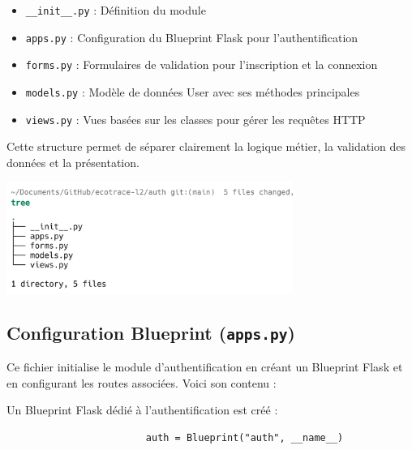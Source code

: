 \documentclass[a4paper,11pt]{article}
\begin{document}
            \begin{itemize}
                \item \texttt{\_\_init\_\_.py} : Définition du module
                \item \texttt{apps.py} : Configuration du Blueprint Flask pour l'authentification
                \item \texttt{forms.py} : Formulaires de validation pour l'inscription et la connexion
                \item \texttt{models.py} : Modèle de données User avec ses méthodes principales
                \item \texttt{views.py} : Vues basées sur les classes pour gérer les requêtes HTTP
            \end{itemize}

            \noindent Cette structure permet de séparer clairement la logique métier, la validation des données et la présentation.

            \begin{center}
                \includegraphics[width=0.7\textwidth]{captures/auth/img1.png}
            \end{center}

            \subsection{Configuration Blueprint (\texttt{apps.py})}
                \noindent Ce fichier initialise le module d'authentification en créant un Blueprint Flask et en configurant les routes associées. Voici son contenu :

                

                \noindent Un Blueprint Flask dédié à l'authentification est créé :
                \begin{tcolorbox}[colback=lightgray!6, colframe=black, left=-35mm, right=5mm, top=2mm, bottom=0mm, boxrule=0.1mm]
                    \begin{verbatim}
                        auth = Blueprint("auth", __name__)
                    \end{verbatim}
                \end{tcolorbox}
\end{document}
